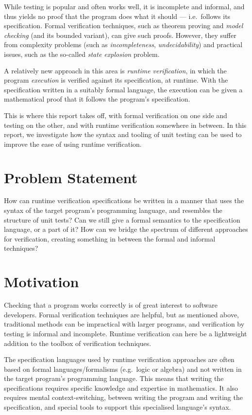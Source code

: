 \documentclass[a4paper,11pt]{kth-mag}
\begin{document}
While testing is popular and often works well, it is incomplete and informal,
and thus yields no proof that the program does what it should --- i.e.\ follows
its specification. Formal verification techniques, such as theorem proving and
\textit{model checking} (and its bounded variant), can give such proofs.
However, they suffer from complexity problems (such as \textit{incompleteness},
\textit{undecidability}) and practical issues, such as the so-called
\textit{state explosion} problem.

A relatively new approach in this area is \textit{runtime verification}, in
which the program \textit{execution} is verified against its specification, at
runtime. With the specification written in a suitably formal language, the
execution can be given a mathematical proof that it follows the program's
specification.

This is where this report takes off, with formal verification on one side and
testing on the other, and with runtime verification somewhere in between. In
this report, we investigate how the syntax and tooling of unit testing can be
used to improve the ease of using runtime verification.


\section{Problem Statement} \label{section-problem-statement}

How can runtime verification specifications be written in a manner that uses
the syntax of the target program's programming language, and resembles the
structure of unit tests? Can we still give a formal semantics to the
specification language, or a part of it? How can we bridge the spectrum of
different approaches for verification, creating something in between the formal
and informal techniques?


\section{Motivation}

Checking that a program works correctly is of great interest to software
developers. Formal verification techniques are helpful, but as mentioned above,
traditional methods can be impractical with larger programs, and verification
by testing is informal and incomplete. Runtime verification can here be a
lightweight addition to the toolbox of verification techniques.

The specification languages used by runtime verification approaches are often
based on formal languages/formalisms (e.g.\ logic or algebra) and not written
in the target program's programming language. This means that writing the
specifications requires specific knowledge and expertise in mathematics. It
also requires mental context-switching, between writing the program and writing
the specification, and special tools to support this specialised language's
syntax.
\end{document}
